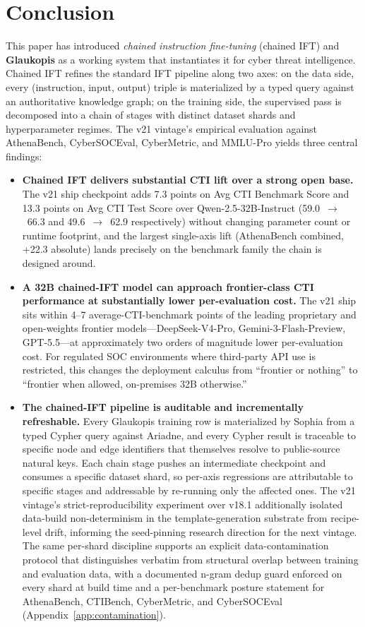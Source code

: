 \documentclass[conference]{IEEEtran}
\begin{document}
\section{Conclusion}

This paper has introduced \textit{chained instruction fine-tuning} (chained IFT) and \textbf{Glaukopis} as a working system that instantiates it for cyber threat intelligence. Chained IFT refines the standard IFT pipeline along two axes: on the data side, every (instruction, input, output) triple is materialized by a typed query against an authoritative knowledge graph; on the training side, the supervised pass is decomposed into a chain of stages with distinct dataset shards and hyperparameter regimes. The v21 vintage's empirical evaluation against AthenaBench, CyberSOCEval, CyberMetric, and MMLU-Pro yields three central findings:

\begin{itemize}
  \item \textbf{Chained IFT delivers substantial CTI lift over a strong open base.} The v21 ship checkpoint adds 7.3 points on Avg CTI Benchmark Score and 13.3 points on Avg CTI Test Score over Qwen-2.5-32B-Instruct (59.0~$\to$~66.3 and 49.6~$\to$~62.9 respectively) without changing parameter count or runtime footprint, and the largest single-axis lift (AthenaBench combined, +22.3 absolute) lands precisely on the benchmark family the chain is designed around.
  \item \textbf{A 32B chained-IFT model can approach frontier-class CTI performance at substantially lower per-evaluation cost.} The v21 ship sits within 4--7 average-CTI-benchmark points of the leading proprietary and open-weights frontier models---DeepSeek-V4-Pro, Gemini-3-Flash-Preview, GPT-5.5---at approximately two orders of magnitude lower per-evaluation cost. For regulated SOC environments where third-party API use is restricted, this changes the deployment calculus from ``frontier or nothing'' to ``frontier when allowed, on-premises 32B otherwise.''
  \item \textbf{The chained-IFT pipeline is auditable and incrementally refreshable.} Every Glaukopis training row is materialized by Sophia from a typed Cypher query against Ariadne, and every Cypher result is traceable to specific node and edge identifiers that themselves resolve to public-source natural keys. Each chain stage pushes an intermediate checkpoint and consumes a specific dataset shard, so per-axis regressions are attributable to specific stages and addressable by re-running only the affected ones. The v21 vintage's strict-reproducibility experiment over v18.1 additionally isolated data-build non-determinism in the template-generation substrate from recipe-level drift, informing the seed-pinning research direction for the next vintage. The same per-shard discipline supports an explicit data-contamination protocol that distinguishes verbatim from structural overlap between training and evaluation data, with a documented n-gram dedup guard enforced on every shard at build time and a per-benchmark posture statement for AthenaBench, CTIBench, CyberMetric, and CyberSOCEval (Appendix~\ref{app:contamination}).
\end{itemize}
\end{document}
